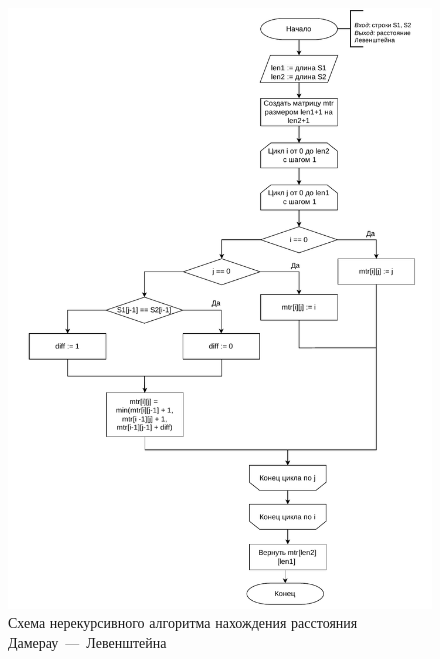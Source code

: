\begin{figure}[h]
	\centering
	\includegraphics[height=0.9\textheight, page=2]{algo-scheme.pdf}
	\caption{Схема нерекурсивного алгоритма нахождения расстояния Дамерау~---~Левенштейна}
	\label{fig:dam-lev-iter}
\end{figure}

\clearpage

